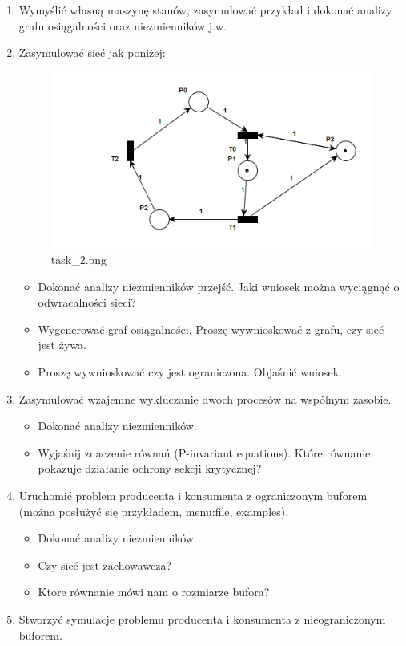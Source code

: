 \documentclass[11pt]{article}
\providecommand{\tightlist}{%
      \setlength{\itemsep}{0pt}\setlength{\parskip}{0pt}}
\begin{document}
\begin{enumerate}
\def\labelenumi{\arabic{enumi}.}
\item
  Wymyślić własną maszynę stanów, zasymulować przykład i dokonać analizy
  grafu osiągalności oraz niezmienników j.w.
\item
  Zasymulować sieć jak poniżej:

  \begin{figure}
  \centering
  \includegraphics{task_2.png}
  \caption{task\_2.png}
  \end{figure}

  \begin{itemize}
  \tightlist
  \item
    Dokonać analizy niezmienników przejść. Jaki wniosek można wyciągnąć
    o odwracalności sieci?
  \item
    Wygenerować graf osiągalności. Proszę wywnioskować z grafu, czy sieć
    jest żywa.
  \item
    Proszę wywnioskować czy jest ograniczona. Objaśnić wniosek.
  \end{itemize}
\item
  Zasymulować wzajemne wykluczanie dwoch procesów na wspólnym zasobie.

  \begin{itemize}
  \tightlist
  \item
    Dokonać analizy niezmienników.
  \item
    Wyjaśnij znaczenie równań (P-invariant equations). Które równanie
    pokazuje działanie ochrony sekcji krytycznej?
  \end{itemize}
\item
  Uruchomić problem producenta i konsumenta z ograniczonym buforem
  (można posłużyć się przykładem, menu:file, examples).

  \begin{itemize}
  \tightlist
  \item
    Dokonać analizy niezmienników.
  \item
    Czy sieć jest zachowawcza?
  \item
    Ktore równanie mówi nam o rozmiarze bufora?
  \end{itemize}
\item
  Stworzyć symulacje problemu producenta i konsumenta z nieograniczonym
  buforem.


\end{enumerate}
\end{document}
